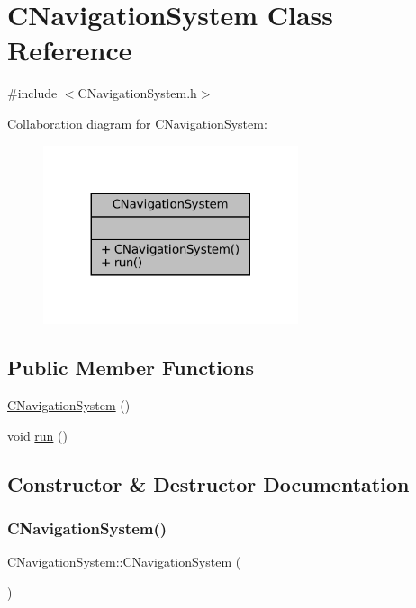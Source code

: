 \hypertarget{classCNavigationSystem}{}\section{C\+Navigation\+System Class Reference}
\label{classCNavigationSystem}


{\ttfamily \#include $<$C\+Navigation\+System.\+h$>$}



Collaboration diagram for C\+Navigation\+System\+:
\nopagebreak
\begin{figure}[H]
\begin{center}
\leavevmode
\includegraphics[width=212pt]{classCNavigationSystem__coll__graph}
\end{center}
\end{figure}
\subsection*{Public Member Functions}
\begin{DoxyCompactItemize}
\item 
\hyperlink{classCNavigationSystem_aa5e3856fa5efdbe6f2b25d974eb96c8f}{C\+Navigation\+System} ()
\item 
void \hyperlink{classCNavigationSystem_a51ad541b47891dc9a07abb61b68a8ad8}{run} ()
\end{DoxyCompactItemize}


\subsection{Constructor \& Destructor Documentation}
\mbox{\label{classCNavigationSystem_aa5e3856fa5efdbe6f2b25d974eb96c8f}} 
\subsubsection{\texorpdfstring{C\+Navigation\+System()}{CNavigationSystem()}}
{\footnotesize\ttfamily C\+Navigation\+System\+::\+C\+Navigation\+System (\begin{DoxyParamCaption}{ }\end{DoxyParamCaption})}

